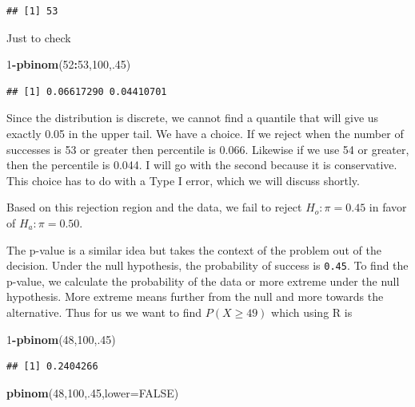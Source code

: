 \documentclass[]{book}
\newenvironment{Shaded}{\begin{snugshade}}{\end{snugshade}}
\newcommand{\KeywordTok}[1]{\textcolor[rgb]{0.13,0.29,0.53}{\textbf{#1}}}
\newcommand{\DataTypeTok}[1]{\textcolor[rgb]{0.13,0.29,0.53}{#1}}
\newcommand{\DecValTok}[1]{\textcolor[rgb]{0.00,0.00,0.81}{#1}}
\newcommand{\OtherTok}[1]{\textcolor[rgb]{0.56,0.35,0.01}{#1}}
\newcommand{\OperatorTok}[1]{\textcolor[rgb]{0.81,0.36,0.00}{\textbf{#1}}}
\newcommand{\NormalTok}[1]{#1}
\theoremstyle{definition}
\theoremstyle{definition}
\theoremstyle{definition}
\theoremstyle{remark}
\begin{document}
\begin{verbatim}
## [1] 53
\end{verbatim}

Just to check

\begin{Shaded}
\begin{Highlighting}[]
\DecValTok{1}\OperatorTok{-}\KeywordTok{pbinom}\NormalTok{(}\DecValTok{52}\OperatorTok{:}\DecValTok{53}\NormalTok{,}\DecValTok{100}\NormalTok{,.}\DecValTok{45}\NormalTok{)}
\end{Highlighting}
\end{Shaded}

\begin{verbatim}
## [1] 0.06617290 0.04410701
\end{verbatim}

Since the distribution is discrete, we cannot find a quantile that will
give us exactly 0.05 in the upper tail. We have a choice. If we reject
when the number of successes is 53 or greater then percentile is 0.066.
Likewise if we use 54 or greater, then the percentile is 0.044. I will
go with the second because it is conservative. This choice has to do
with a Type I error, which we will discuss shortly.

Based on this rejection region and the data, we fail to reject
\(H_{o}: \pi = 0.45\) in favor of \(H_{a}: \pi = 0.50\).

The p-value is a similar idea but takes the context of the problem out
of the decision. Under the null hypothesis, the probability of success
is \texttt{0.45}. To find the p-value, we calculate the probability of
the data or more extreme under the null hypothesis. More extreme means
further from the null and more towards the alternative. Thus for us we
want to find \(P(X \geq 49)\) which using R is

\begin{Shaded}
\begin{Highlighting}[]
\DecValTok{1}\OperatorTok{-}\KeywordTok{pbinom}\NormalTok{(}\DecValTok{48}\NormalTok{,}\DecValTok{100}\NormalTok{,.}\DecValTok{45}\NormalTok{)}
\end{Highlighting}
\end{Shaded}

\begin{verbatim}
## [1] 0.2404266
\end{verbatim}

\begin{Shaded}
\begin{Highlighting}[]
\KeywordTok{pbinom}\NormalTok{(}\DecValTok{48}\NormalTok{,}\DecValTok{100}\NormalTok{,.}\DecValTok{45}\NormalTok{,}\DataTypeTok{lower=}\OtherTok{FALSE}\NormalTok{)}
\end{Highlighting}
\end{Shaded}
\end{document}
